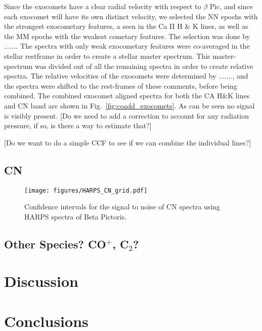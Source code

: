\documentclass{aa}
\begin{document}
Since the exocomets have a clear radial velocity with respect to $\beta$ Pic, and since each exocomet will have its own distinct velocity, we selected the NN epochs with the strongest exocometary features, a seen in the Ca II H \& K lines, as well as the MM epochs with the weakest cometary features. The selection was done by .......
The spectra with only weak exocometary features were co-averaged in the stellar restframe in order to create a stellar master spectrum. This master-spectrum was divided out of all the remaining spectra in order to create relative spectra. 
The relative velocities of the exocomets were determined by ......., and the spectra were shifted to the rest-frames of these comments, before being combined. The combined exocomet aligned spectra for both the CA H\&K lines and CN band are shown in Fig.~\ref{fig:coadd_exocomets}. As can be seen no signal is visibly present. [Do we need to add a correction to account for any radiation pressure, if so, is there a way to estimate that?]

[Do we want to do a simple CCF to see if we can combine the individual lines?]

\subsection{CN}

\begin{figure}
    \begin{centering}
        \texttt{[image: figures/HARPS\_CN\_grid.pdf]}
        \caption{Confidence intervals for the signal to noise of CN spectra using HARPS spectra of Beta Pictoris.}
        \label{fig:HARPS_CN_grid}
    \end{centering}
\end{figure}



\subsection{Other Species? CO$^+$, C$_2$?}




\section{Discussion}

\section{Conclusions}
\end{document}
